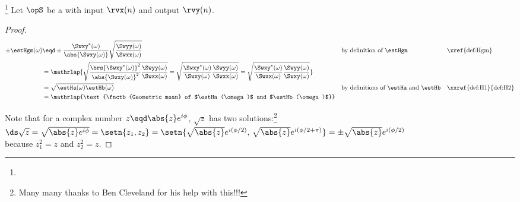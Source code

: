 \begin{proposition}
\footnote{
  }
\label{prop:Hgm}
Let $\opS$ be a  with input $\rvx(n)$ and output $\rvy(n)$.
\end{proposition}
\begin{proof}
\begin{align*}
  \pm\estHgm(\omega)
    &\eqd \pm\frac{\Swxy^\ast(\omega)}     %
                  {\abs{\Swxy(\omega)}}    %
             \sqrt{\frac{\Swyy(\omega)}    %
                        {\Swxx(\omega)}}   %
    && \text{by definition of $\estHgm$}   %
    && \text{\xref{def:Hgm}}               %
  \\&=\mathrlap{
       \sqrt{
         \frac{\brs{\Swxy^\ast(\omega)}^2}
              {\abs{\Swxy(\omega)}^2}
         \frac{\Swyy(\omega)}
              {\Swxx(\omega)}}
     = \sqrt{
         \frac{\Swxy^\ast(\omega)}
              {\Swxy(\omega)}
         \frac{\Swyy(\omega)}
              {\Swxx(\omega)}}
     = \sqrt{
         \frac{\Swxy^\ast(\omega)}
              {\Swxx(\omega)}
         \frac{\Swyy(\omega)}
              {\Swxy(\omega)}}
       }
  \\&= \sqrt{\estHa(\omega)\estHb(\omega)}
    && \text{by definitions of $\estHa$ and $\estHb$}
    && \text{\xxref{def:H1}{def:H2}}
  \\&= \mathrlap{\text{\fnctb{Geometric mean} of $\estHa(\omega)$ and $\estHb(\omega)$}}
\end{align*}

Note that for a complex number $z\eqd\abs{z}e^{i\phi}$, $\sqrt{z}$ has two solutions:\footnote{Many many thanks to Ben Cleveland for his help with this!!!}
\\\indentx$\ds\sqrt{z} = \sqrt{\abs{z}e^{i\phi}} = \setn{z_1,z_2} 
   = \setn{\sqrt{\abs{z}}e^{i(\phi/2)},\,\sqrt{\abs{z}}e^{i(\phi/2+\pi)}}
   = \pm\sqrt{\abs{z}}e^{i(\phi/2)}$
\\
because $z_1^2=z$ and $z_2^2=z$.
\end{proof}

